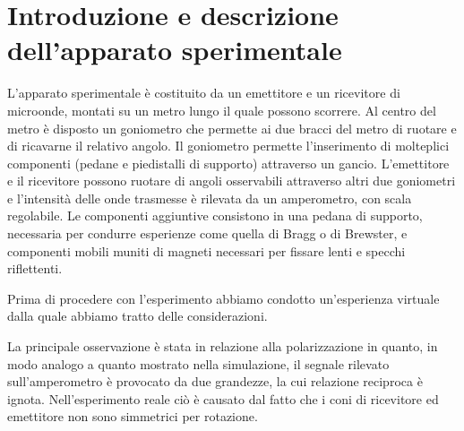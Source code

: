 \section{Introduzione e descrizione dell'apparato sperimentale}
L'apparato sperimentale è costituito da un emettitore e un ricevitore di microonde, montati su un metro lungo il quale possono scorrere. Al centro del metro è disposto un goniometro che permette ai due bracci del metro di ruotare e di ricavarne il relativo angolo. Il goniometro permette l'inserimento di molteplici componenti (pedane e piedistalli di supporto) attraverso un gancio. L'emettitore e il ricevitore possono ruotare di angoli osservabili attraverso altri due goniometri e l'intensità delle onde trasmesse è rilevata da un amperometro, con scala regolabile.
Le componenti aggiuntive consistono in una pedana di supporto, necessaria per condurre esperienze come quella di Bragg o di Brewster, e componenti mobili muniti di magneti necessari per fissare lenti e specchi riflettenti.

Prima di procedere con l'esperimento abbiamo condotto un'esperienza virtuale dalla quale abbiamo tratto delle considerazioni.

La principale osservazione è stata in relazione alla polarizzazione in quanto, in modo analogo a quanto mostrato nella simulazione, il segnale rilevato sull'amperometro è provocato da due grandezze, la cui relazione reciproca è ignota. Nell'esperimento reale ciò è causato dal fatto che i coni di ricevitore ed emettitore non sono simmetrici per rotazione.